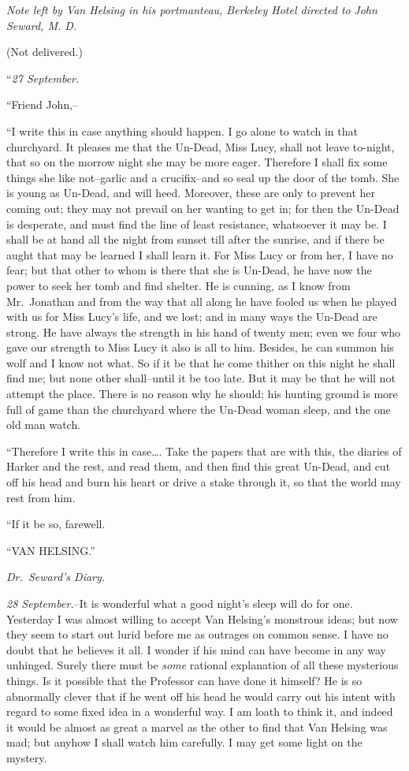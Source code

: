 \documentclass[12pt,openright]{book}
\begin{document}
\textit{Note left by Van Helsing in his portmanteau, Berkeley Hotel directed to}\textit{ }\textit{John Seward, M. D.}

(Not delivered.)

“\textit{27 September.}

“Friend John,–

“I write this in case anything should happen. I go alone to watch in that churchyard. It pleases me that the Un-Dead, Miss Lucy, shall not leave to-night, that so on the morrow night she may be more eager. Therefore I shall fix some things she like not–garlic and a crucifix–and so seal up the door of the tomb. She is young as Un-Dead, and will heed. Moreover, these are only to prevent her coming out; they may not prevail on her wanting to get in; for then the Un-Dead is desperate, and must find the line of least resistance, whatsoever it may be. I shall be at hand all the night from sunset till after the sunrise, and if there be aught that may be learned I shall learn it. For Miss Lucy or from her, I have no fear; but that other to whom is there that she is Un-Dead, he have now the power to seek her tomb and find shelter. He is cunning, as I know from Mr. Jonathan and from the way that all along he have fooled us when he played with us for Miss Lucy’s life, and we lost; and in many ways the Un-Dead are strong. He have always the strength in his hand of twenty men; even we four who gave our strength to Miss Lucy it also is all to him. Besides, he can summon his wolf and I know not what. So if it be that he come thither on this night he shall find me; but none other shall–until it be too late. But it may be that he will not attempt the place. There is no reason why he should; his hunting ground is more full of game than the churchyard where the Un-Dead woman sleep, and the one old man watch.

“Therefore I write this in case…. Take the papers that are with this, the diaries of Harker and the rest, and read them, and then find this great Un-Dead, and cut off his head and burn his heart or drive a stake through it, so that the world may rest from him.

“If it be so, farewell.

“VAN HELSING.”

\textit{Dr. Seward’s Diary.}

\textit{28 September.}–It is wonderful what a good night’s sleep will do for one. Yesterday I was almost willing to accept Van Helsing’s monstrous ideas; but now they seem to start out lurid before me as outrages on common sense. I have no doubt that he believes it all. I wonder if his mind can have become in any way unhinged. Surely there must be \textit{some} rational explanation of all these mysterious things. Is it possible that the Professor can have done it himself? He is so abnormally clever that if he went off his head he would carry out his intent with regard to some fixed idea in a wonderful way. I am loath to think it, and indeed it would be almost as great a marvel as the other to find that Van Helsing was mad; but anyhow I shall watch him carefully. I may get some light on the mystery.
\end{document}
